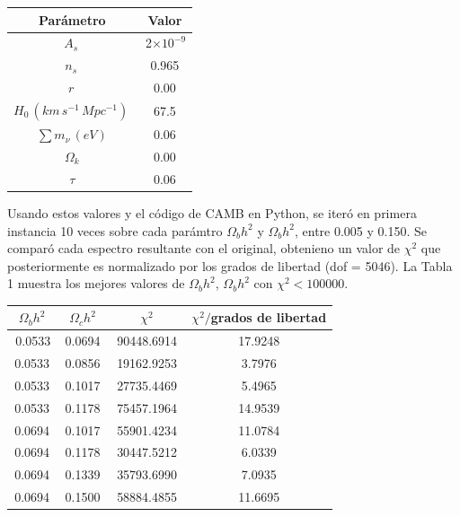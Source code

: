 \documentclass[twocolumn,letterpaper,spanish]{revtex4}
\numberwithin{equation}{section}
\begin{document}
\begin{center}
\begin{tabular}{c | c}
	\,Par\'ametro\, & \,Valor\, \\ \hline
	$A_s$\,  &  \,2$\times10^{-9}$ \\
	$n_s$\,  &  0.965 \\
 	$r$\,    &  0.00  \\
 	$H_0\,(km\,s^{-1}\,Mpc^{-1})$\, &  67.5 \\
 	$\sum m_{\nu}\,(eV)$ & 0.06 \\ 
 	$\Omega_k$ & 0.00 \\
 	$\tau$  & 0.06 \\ 
\end{tabular}\label{tabla1}
\end{center}

Usando estos valores y el c\'odigo de CAMB en Python, se iter\'o en primera instancia 10 veces sobre cada par\'amtro $\Omega_b h^2$ y $\Omega_b h^2$, entre 0.005 y 0.150. Se compar\'o cada espectro resultante con el original, obtenieno un valor de $\chi^2$ que posteriormente es normalizado por los grados de libertad (dof = 5046). La Tabla 1 muestra los mejores valores de $\Omega_b h^2$, $\Omega_b h^2$ con $\chi^2<100000$. 

\begin{center}
\begin{tabular}{| c | c | c | c |}\hline
$\Omega_b h^2$ & $\Omega_c h^2$ & $\chi^2$ & $\chi^2/$grados de libertad    \\ \hline
	\,0.0533  & \,0.0694\,  &  \,90448.6914\,  &  17.9248 \\
	0.0533  & 0.0856  &  19162.9253  &  3.7976 \\
	0.0533  & 0.1017  &  27735.4469  &  5.4965 \\
	0.0533  & 0.1178  &  75457.1964  & 14.9539 \\
	0.0694  & 0.1017  &  55901.4234  & 11.0784 \\
	0.0694  & 0.1178  &  30447.5212  &  6.0339 \\
	0.0694  & 0.1339  &  35793.6990  &  7.0935 \\
	0.0694  & 0.1500  &  58884.4855  & 11.6695 \\ \hline
\end{tabular}\label{tabla1}
\end{center}
\end{document}
